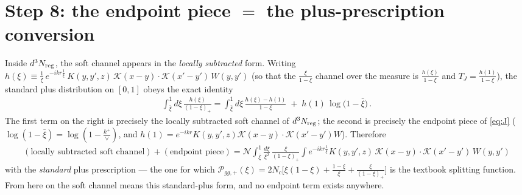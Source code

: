 \documentclass[9pt]{article}
\newcommand{\KK}{\mathcal K(x-y)\!\cdot\!\mathcal K(x'-y')}
\begin{document}
\section{Step 8: the endpoint piece $=$ the plus-prescription conversion}
Inside $d^{3}N_{\rm reg}$, the soft channel appears in the \emph{locally subtracted} form.
Writing $h(\xi)\equiv\frac{1}{\xi}\,e^{-ikr\frac1\xi}\,K(y,y',z)\,\KK\,W(y,y')$ (so that the
$\frac{\xi}{1-\xi}$ channel over the measure is $\frac{h(\xi)}{1-\xi}$ and $T_{J}=\frac{h(1)}{1-\xi}$),
the standard plus distribution on $[0,1]$ obeys the exact identity
\begin{align}\label{eq:stdplus}
\int_{\bar\xi}^{1}d\xi\,\frac{h(\xi)}{(1-\xi)_{+}}
=\int_{\bar\xi}^{1}d\xi\,\frac{h(\xi)-h(1)}{1-\xi}
\;+\;h(1)\,\log\Big(1-\bar\xi\Big)\,.
\end{align}
The first term on the right is precisely the locally subtracted soft channel of
$d^{3}N_{\rm reg}$; the second is precisely the endpoint piece of \eqref{eq:J}
($\log(1-\bar\xi)=\log(1-\frac{k^{+}}{\vee})$, and $h(1)=e^{-ikr}K(y,y',z)\KK W$). Therefore
\begin{align}
(\text{locally subtracted soft channel})+(\text{endpoint piece})
=\mathcal N\int_{\bar\xi}^{1}\frac{d\xi}{\xi^{2}}\,\frac{\xi}{(1-\xi)_{+}}
\int e^{-ikr\frac1\xi}K(y,y',z)\,\KK\,W(y,y')
\end{align}
with the \emph{standard} plus prescription --- the one for which
$\mathcal P_{gg,+}(\xi)=2N_{c}\big[\xi(1-\xi)+\frac{1-\xi}{\xi}+\frac{\xi}{(1-\xi)_{+}}\big]$
is the textbook splitting function. From here on the soft channel means this standard-plus
form, and no endpoint term exists anywhere.
\end{document}
